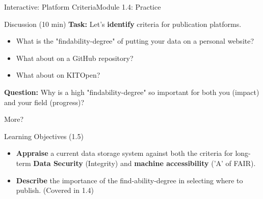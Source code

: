 \begin{frame}{Interactive: Platform Criteria}{Module 1.4: Practice}
    \begin{block}{Discussion (10 min)}
        \textbf{Task:} Let's \textbf{identify} criteria for publication platforms.
        \begin{itemize}
            \item What is the "findability-degree" of putting your data on a personal website?
            \pause
            \item What about on a GitHub repository?
            \pause
            \item What about on KITOpen?
        \end{itemize}
        \pause
        \textbf{Question:} Why is a high "findability-degree" so important for both you (impact) and your field (progress)?
    \end{block}
    More? \cite{koubaa_energy_2025}
\end{frame}

\begin{frame}{Learning Objectives (1.5)}
    \begin{itemize}
        \item \textbf{Appraise} a current data storage system against both the criteria for long-term \textbf{Data Security} (Integrity) and \textbf{machine accessibility} ('A' of FAIR).
        \item \textbf{Describe} the importance of the find-ability-degree in selecting where to publish. (Covered in 1.4)
    \end{itemize}
\end{frame}

